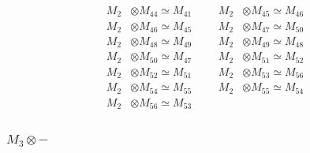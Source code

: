 \begin{align*}
M_{2} &\otimes M_{44} \simeq M_{41} &&& M_{2} &\otimes M_{45} \simeq M_{46}\\
M_{2} &\otimes M_{46} \simeq M_{45} &&& M_{2} &\otimes M_{47} \simeq M_{50}\\
M_{2} &\otimes M_{48} \simeq M_{49} &&& M_{2} &\otimes M_{49} \simeq M_{48}\\
M_{2} &\otimes M_{50} \simeq M_{47} &&& M_{2} &\otimes M_{51} \simeq M_{52}\\
M_{2} &\otimes M_{52} \simeq M_{51} &&& M_{2} &\otimes M_{53} \simeq M_{56}\\
M_{2} &\otimes M_{54} \simeq M_{55} &&& M_{2} &\otimes M_{55} \simeq M_{54}\\
M_{2} &\otimes M_{56} \simeq M_{53}
\end{align*}

\subsubsection{$ M_{3}\otimes -$}
